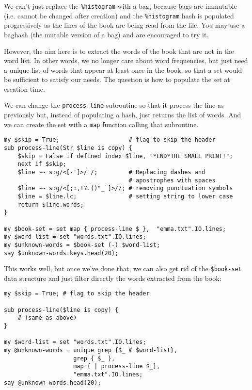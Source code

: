 We can't just replace the \verb'%histogram' with a bag, because 
bags are immutable (i.e. cannot be changed after creation) 
and the \verb'%histogram' hash is populated progressively as 
the lines of the book are being read from the file. You may use 
a baghash (the mutable version of a bag) and are encouraged 
to try it.

However, the aim here is to extract the words of the book that 
are not in the word list. In other words, we no longer care 
about word frequencies, but just need a unique list of words 
that appear at least once in the book, so that a set would 
be sufficient to satisfy our needs. The question is how to 
populate the set at creation time.

We can change the {\tt process-line} subroutine so that it 
process the line as previously but, instead of populating a 
hash, just returns the list of words. And we can create the 
set with a {\tt map} function calling that subroutine.

\begin{verbatim}
my $skip = True;                    # flag to skip the header
sub process-line(Str $line is copy) {
    $skip = False if defined index $line, "*END*THE SMALL PRINT!";
    next if $skip;
    $line ~~ s:g/<[-']>/ /;         # Replacing dashes and 
                                    # apostrophes with spaces
    $line ~~ s:g/<[;:,!?.()"_`]>//; # removing punctuation symbols
    $line = $line.lc;               # setting string to lower case
    return $line.words;
}

my $book-set = set map { process-line $_},  "emma.txt".IO.lines; 
my $word-list = set "words.txt".IO.lines;
my $unknown-words = $book-set (-) $word-list;
say $unknown-words.keys.head(20);
\end{verbatim}

This works well, but once we've done that, we can also 
get rid of the \verb'$book-set' data structure and 
just filter directly the words extracted from the book:

\begin{verbatim}
my $skip = True; # flag to skip the header

sub process-line($line is copy) {
    # (same as above)
}

my $word-list = set "words.txt".IO.lines;
my @unknown-words = unique grep {$_ ∉ $word-list}, 
                    grep { $_ }, 
                    map { | process-line $_},  
                    "emma.txt".IO.lines; 
say @unknown-words.head(20);
\end{verbatim}

